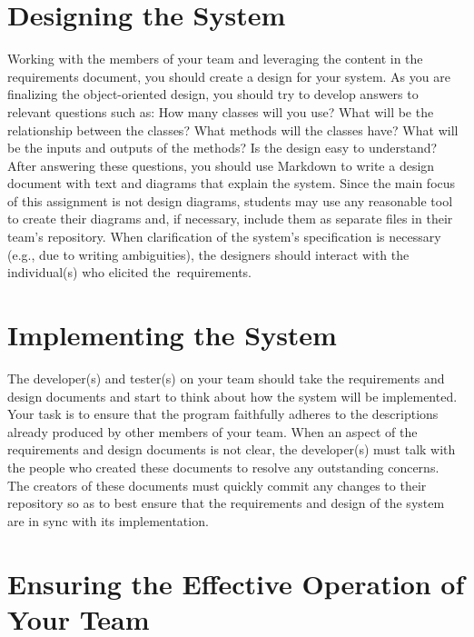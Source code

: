 \section*{Designing the System}

Working with the members of your team and leveraging the content in the requirements document, you should create a
design for your system.  As you are finalizing the object-oriented design, you should try to develop answers to relevant
questions such as: How many classes will you use? What will be the relationship between the classes? What methods will
the classes have? What will be the inputs and outputs of the methods?  Is the design easy to understand?  After
answering these questions, you should use Markdown to write a design document with text and diagrams that explain the
system. Since the main focus of this assignment is not design diagrams, students may use any reasonable tool to create
their diagrams and, if necessary, include them as separate files in their team's repository. When clarification of the
system's specification is necessary (e.g., due to writing ambiguities), the designers should interact with the
individual(s) who elicited \mbox{the requirements}.

\section*{Implementing the System}

The developer(s) and tester(s) on your team should take the requirements and design documents and start to think about
how the system will be implemented. Your task is to ensure that the program faithfully adheres to the descriptions
already produced by other members of your team. When an aspect of the requirements and design documents is not clear,
the developer(s) must talk with the people who created these documents to resolve any outstanding concerns. The creators
of these documents must quickly commit any changes to their repository so as to best ensure that the requirements and design
of the system are in sync with its implementation.

\section*{Ensuring the Effective Operation of Your Team}

